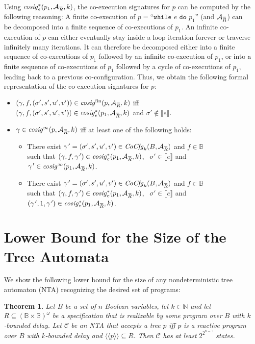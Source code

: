\documentclass[submission,copyright,creativecommons]{eptcs}
\newtheorem{theorem}{Theorem}
\newcommand{\overbar}[1]{\mkern 1.5mu\overline{\mkern-1.5mu#1\mkern-1.5mu}\mkern 1.5mu}\newcommand{\nothing}{$\,$}
\newcommand{\z}[1]{\text{#1}}
\newcommand{\aut}[1]{\mathcal{#1}}
\newcommand{\specaut}{\aut{A}_{\overbar{R}}}
\newcommand{\f}[1]{\mathit{#1}}
\newcommand{\sembrack}[1]{\llbracket #1 \rrbracket}
\newcommand{\sembrackk}[1]{\langle\langle #1 \rangle\rangle}\newcommand{\lbar}[1]{\overline{#1}}
\newcommand{\cocfgk}{\f{CoCfg}_k(B,\specaut)}
\newcommand{\kfg}{\gamma}
\newcommand{\sigmain}{\mathbb{B}}
\newcommand{\sigmaout}{\mathbb{B}}
\begin{document}
Using $\f{cosig}^*_e(p_1,\specaut,k)$,
the co-execution signatures for $p$ can be
computed by the following reasoning:
A finite co-execution of
$p = \z{``}\texttt{while } e \texttt{ do } p_1\z{''}$ (and $\specaut$)
can be decomposed into a finite sequence of co-executions of $p_1$.
An infinite co-execution of $p$ can either eventually stay
inside a loop iteration forever or traverse infinitely many iterations.
It can therefore be decomposed either into a finite sequence of
co-executions of $p_1$ followed by an infinite co-execution
of $p_1$,
or into a finite sequence of co-executions of $p_1$ followed by
a cycle of co-executions of $p_1$, leading back to a previous
co-configuration.
Thus, we obtain the following formal representation of the co-execution
signatures for $p$:

\begin{itemize}
	\item $( \kfg, f, (\sigma',s',u',v') ) \in \f{cosig}^\z{fin}(p,\specaut,k)$ \; iff \;
		$( \kfg, f, (\sigma',s',u',v') ) \in \f{cosig}^*_e(p_1,\specaut,k)$
		and $\sigma' \notin \sembrack{e}$.
	\item $\kfg \in \f{cosig}^\infty(p,\specaut,k)$ iff at least one of the following holds:
		\begin{itemize}
			\item There exist $\kfg\kern+.11em' = (\sigma',s',u',v') \in \cocfgk$ and
				$f \in \mathbb{B}$ \\
				such that
				$(\kfg, f, \kfg\kern+.11em') \in \f{cosig}^*_e(p_1,\specaut,k)$, \,
				$\sigma' \in \sembrack{e}$ and
				$\kfg\kern+.11em' \in \f{cosig}^\infty(p_1,\specaut,k)$.
			\item There exist $\kfg\kern+.11em' = (\sigma',s',u',v') \in \cocfgk$ and
				$f \in \mathbb{B}$ \\
				such that
				$(\kfg, f, \kfg\kern+.11em') \in \f{cosig}^*_e(p_1,\specaut,k)$, \,
				$\sigma' \in \sembrack{e}$ and
				$(\kfg\kern+.11em', 1, \kfg\kern+.11em') \in \f{cosig}^*_e(p_1,\specaut,k)$.
		\end{itemize}
\end{itemize}


\section{Lower Bound for the Size of the Tree Automata}\label{optimality}

We show the following lower bound for the size of any nondeterministic tree
automaton (NTA) recognizing the desired set of programs:
\begin{theorem}\label{lowerboundnta}
	Let $B$ be a set of $n$ Boolean variables,
	let $k \in \mathbb{N}$ and
	let $R \subseteq \left(\sigmain \times \sigmaout\right)^\omega$
	be a specification that is realizable by some program over $B$ with
	$k$-bounded delay.
	Let $\aut{C}$ be an NTA that accepts
	a tree $p$ iff $p$ is a reactive program over $B$ with $k$-bounded delay
	and $\sembrackk{p} \subseteq R$.
	Then $\aut{C}$ has at least $2^{2^{n-1}}$ states.
\end{theorem}
\end{document}
